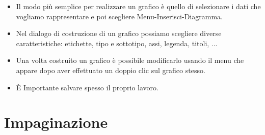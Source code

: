 \begin{itemize} [nosep]
\item Il modo più semplice per realizzare un grafico è quello di selezionare
i dati che vogliamo rappresentare e poi scegliere Menu-Inserisci-Diagramma.
\item Nel dialogo di costruzione di un grafico possiamo scegliere diverse
caratteristiche: etichette, tipo e sottotipo, assi, legenda, titoli, ...
\item Una volta costruito un grafico è possibile modificarlo usando il menu
che appare dopo aver effettuato un doppio clic sul grafico stesso.
\item È Importante salvare spesso il proprio lavoro.
\end{itemize}

\section{Impaginazione}
\label{fogliodicalcolo:impaginazione}


